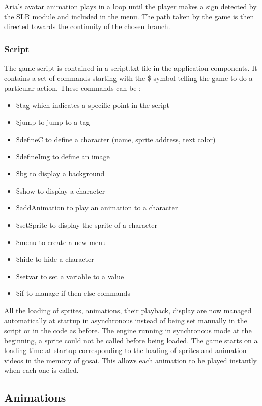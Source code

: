 Aria's avatar animation plays in a loop until the player makes a sign detected by the SLR module and included in the menu. The path taken by the game is then directed towards the continuity of the chosen branch.

\subsubsection{Script}

The game script is contained in a script.txt file in the application components. It contains a set of commands starting with the \$ symbol telling the game to do a particular action. These commands can be :
\begin{itemize}
    \item \$tag which indicates a specific point in the script
    \item \$jump to jump to a tag
    \item \$defineC to define a character (name, sprite address, text color)
    \item \$defineImg to define an image
    \item \$bg to display a background
    \item \$show to display a character
    \item \$addAnimation to play an animation to a character
    \item \$setSprite to display the sprite of a character
    \item \$menu to create a new menu
    \item \$hide to hide a character
    \item \$setvar to set a variable to a value
    \item \$if to manage if then else commands
\end{itemize}

All the loading of sprites, animations, their playback, display are now managed automatically at startup in asynchronous instead of being set manually in the script or in the code as before. The engine running in synchronous mode at the beginning, a sprite could not be called before being loaded. The game starts on a loading time at startup corresponding to the loading of sprites and animation videos in the memory of gosai. This allows each animation to be played instantly when each one is called.

\subsection{Animations}

